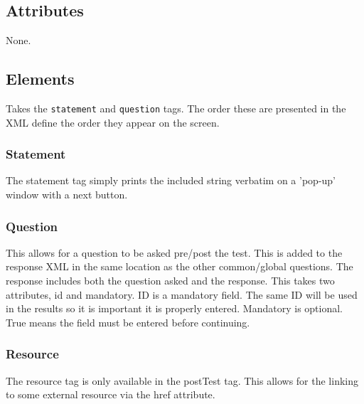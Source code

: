 \documentclass{article}
\begin{document}
\subsection{Attributes}
None.

\subsection{Elements}
Takes the \texttt{statement} and \texttt{question} tags. The order these are presented in the XML define the order they appear on the screen.

\subsubsection{Statement}

The statement tag simply prints the included string verbatim on a 'pop-up' window with a next button.

\subsubsection{Question}

This allows for a question to be asked pre/post the test. This is added to the response XML in the same location as the other common/global questions. The response includes both the question asked and the response. This takes two attributes, id and mandatory. ID is a mandatory field. The same ID will be used in the results so it is important it is properly entered. Mandatory is optional. True means the field must be entered before continuing.

\subsubsection{Resource}

The resource tag is only available in the postTest tag. This allows for the linking to some external resource via the href attribute.
\end{document}
